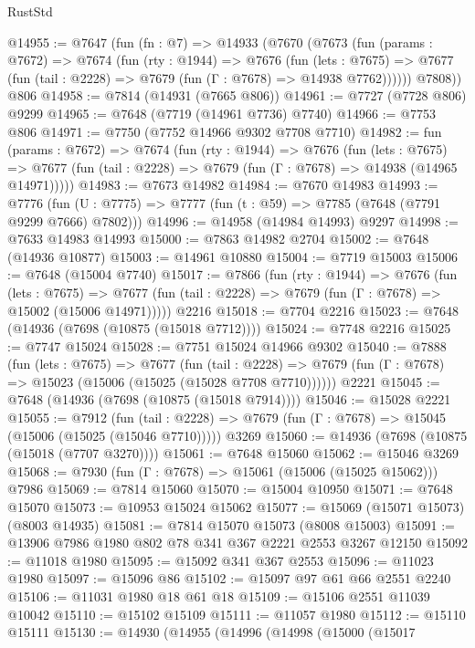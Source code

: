 \begin{lexlean}{RustStd}
\begin{coremodule}
@14955 := @7647
    (fun (fn : @7) =>
    @14933
      (@7670
        (@7673
          (fun (params : @7672) =>
          @7674
            (fun (rty : @1944) =>
            @7676
              (fun (lets : @7675) =>
              @7677 (fun (tail : @2228) => @7679 (fun (Γ : @7678) => @14938 @7762))))))
        @7808))
    @806
@14958 := @7814 (@14931 (@7665 @806))
@14961 := @7727 (@7728 @806) @9299
@14965 := @7648 (@7719 (@14961 @7736) @7740)
@14966 := @7753 @806
@14971 := @7750 (@7752 @14966 @9302 @7708 @7710)
@14982 := fun (params : @7672) =>
  @7674
    (fun (rty : @1944) =>
    @7676
      (fun (lets : @7675) =>
      @7677 (fun (tail : @2228) => @7679 (fun (Γ : @7678) => @14938 (@14965 @14971)))))
@14983 := @7673 @14982
@14984 := @7670 @14983
@14993 := @7776
    (fun (U : @7775) => @7777 (fun (t : @59) => @7785 (@7648 (@7791 @9299 @7666) @7802)))
@14996 := @14958 (@14984 @14993) @9297
@14998 := @7633 @14983 @14993
@15000 := @7863 @14982 @2704
@15002 := @7648 (@14936 @10877)
@15003 := @14961 @10880
@15004 := @7719 @15003
@15006 := @7648 (@15004 @7740)
@15017 := @7866
    (fun (rty : @1944) =>
    @7676
      (fun (lets : @7675) =>
      @7677 (fun (tail : @2228) => @7679 (fun (Γ : @7678) => @15002 (@15006 @14971)))))
    @2216
@15018 := @7704 @2216
@15023 := @7648 (@14936 (@7698 (@10875 (@15018 @7712))))
@15024 := @7748 @2216
@15025 := @7747 @15024
@15028 := @7751 @15024 @14966 @9302
@15040 := @7888
    (fun (lets : @7675) =>
    @7677
      (fun (tail : @2228) =>
      @7679 (fun (Γ : @7678) => @15023 (@15006 (@15025 (@15028 @7708 @7710))))))
    @2221
@15045 := @7648 (@14936 (@7698 (@10875 (@15018 @7914))))
@15046 := @15028 @2221
@15055 := @7912
    (fun (tail : @2228) => @7679 (fun (Γ : @7678) => @15045 (@15006 (@15025 (@15046 @7710)))))
    @3269
@15060 := @14936 (@7698 (@10875 (@15018 (@7707 @3270))))
@15061 := @7648 @15060
@15062 := @15046 @3269
@15068 := @7930 (fun (Γ : @7678) => @15061 (@15006 (@15025 @15062))) @7986
@15069 := @7814 @15060
@15070 := @15004 @10950
@15071 := @7648 @15070
@15073 := @10953 @15024 @15062
@15077 := @15069 (@15071 @15073) (@8003 @14935)
@15081 := @7814 @15070 @15073 (@8008 @15003)
@15091 := @13906 @7986 @1980 @802 @78 @341 @367 @2221 @2553 @3267 @12150
@15092 := @11018 @1980
@15095 := @15092 @341 @367 @2553
@15096 := @11023 @1980
@15097 := @15096 @86
@15102 := @15097 @97 @61 @66 @2551 @2240
@15106 := @11031 @1980 @18 @61 @18
@15109 := @15106 @2551 @11039 @10042
@15110 := @15102 @15109
@15111 := @11057 @1980
@15112 := @15110 @15111
@15130 := @14930
    (@14955
      (@14996
        (@14998
          (@15000
            (@15017

\end{coremodule}
\end{lexlean}
